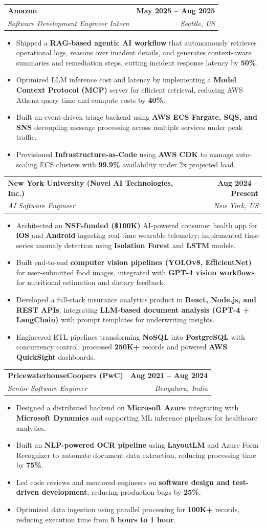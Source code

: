 \documentclass[letterpaper,10.5pt]{extarticle}
\makeatletter
\newcommand{\resumeItem}[1]{
\item\small{{#1}\vspace{-3.5pt}}
}
\newcommand{\resumeSubheading}[4]{
\vspace{6pt}
\item
\begin{tabular*}{1.0\textwidth}[t]{l@{\extracolsep{\fill}}r}
\textbf{#1} & \textbf{\small #2} \\
\textit{\small#3} & \textit{\small #4} \\
\end{tabular*}\vspace{-5.5pt}
}
\newcommand{\resumeItemListStart}{\begin{itemize}[leftmargin=*, itemsep=0pt, topsep=0pt]}
\newcommand{\resumeItemListEnd}{\end{itemize}\vspace{-3pt}}
\makeatother
\begin{document}
\resumeSubheading
  {Amazon}{May 2025 -- Aug 2025}
  {Software Development Engineer Intern}{Seattle, US}
\resumeItemListStart
  \resumeItem{Shipped a \textbf{RAG-based agentic AI workflow} that autonomously retrieves operational logs, reasons over incident details, and generates context-aware summaries and remediation steps, cutting incident response latency by \textbf{50\%}.}
  \resumeItem{Optimized LLM inference cost and latency by implementing a \textbf{Model Context Protocol (MCP)} server for efficient retrieval, reducing AWS Athena query time and compute costs by \textbf{40\%}.}
  \resumeItem{Built an event-driven triage backend using \textbf{AWS ECS Fargate, SQS, and SNS} decoupling message processing across multiple services under peak traffic.}
  \resumeItem{Provisioned \textbf{Infrastructure-as-Code} using \textbf{AWS CDK} to manage auto-scaling ECS clusters with \textbf{99.9\%} availability under 2x projected load.}
\resumeItemListEnd

\resumeSubheading
  {New York University (Novel AI Technologies, Inc.)}{Aug 2024 -- Present}
  {AI Software Engineer}{New York, US}
\resumeItemListStart
  \resumeItem{Architected an \textbf{NSF-funded (\$100K)} AI-powered consumer health app for \textbf{iOS} and \textbf{Android} ingesting real-time wearable telemetry; implemented time-series anomaly detection using \textbf{Isolation Forest} and \textbf{LSTM} models.}
  \resumeItem{Built end-to-end \textbf{computer vision pipelines (YOLOv8, EfficientNet)} for user-submitted food images, integrated with \textbf{GPT-4 vision workflows} for nutritional estimation and dietary feedback.}
  \resumeItem{Developed a full-stack insurance analytics product in \textbf{React, Node.js, and REST APIs}, integrating \textbf{LLM-based document analysis (GPT-4 + LangChain)} with prompt templates for underwriting insights.}
  \resumeItem{Engineered ETL pipelines transforming \textbf{NoSQL} into \textbf{PostgreSQL} with concurrency control; processed \textbf{250K+} records and powered \textbf{AWS QuickSight} dashboards.}
\resumeItemListEnd

\resumeSubheading
  {PricewaterhouseCoopers (PwC)}{Aug 2021 -- Aug 2024}
  {Senior Software Engineer}{Bengaluru, India}
\resumeItemListStart
  \resumeItem{Designed a distributed backend on \textbf{Microsoft Azure} integrating with \textbf{Microsoft Dynamics} and supporting ML inference pipelines for healthcare analytics.}
  \resumeItem{Built an \textbf{NLP-powered OCR pipeline} using \textbf{LayoutLM} and Azure Form Recognizer to automate document data extraction, reducing processing time by \textbf{75\%}.}
  \resumeItem{Led code reviews and mentored engineers on \textbf{software design and test-driven development}, reducing production bugs by \textbf{25\%}.}
  \resumeItem{Optimized data ingestion using parallel processing for \textbf{100K+} records, reducing execution time from \textbf{5 hours to 1 hour}.}
\resumeItemListEnd
\end{document}
